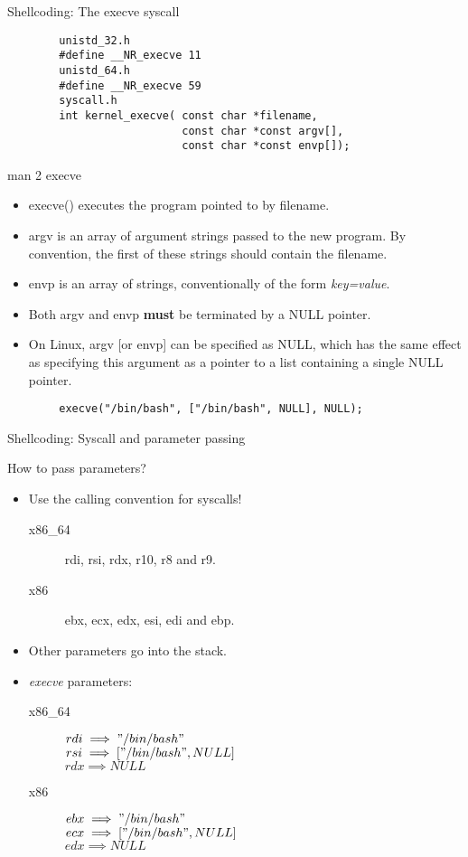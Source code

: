 \begin{frame}{Shellcoding: The execve syscall}
	\ccode
	\begin{lstlisting}
		unistd_32.h
		#define __NR_execve 11
		unistd_64.h
		#define __NR_execve 59
		syscall.h
		int kernel_execve( const char *filename,
		                   const char *const argv[],
		                   const char *const envp[]);
	\end{lstlisting}
	\begin{block}{man 2 execve}
		\begin{itemize}
			\item execve() executes  the  program  pointed to by filename.
			\item argv is an array of argument strings passed to the new program. By
				convention, the first of these  strings  should contain the filename.
			\item envp is an array of strings, conventionally of the form \emph{key=value}.
			\item Both argv and envp \textbf{must} be terminated by a NULL pointer.
			\item On Linux, argv [or envp] can be specified as NULL, which has the same effect as specifying  this  argument as a pointer to a list containing a single NULL pointer.
		\end{itemize}
	\end{block}
	\ccode
	\begin{lstlisting}
		execve("/bin/bash", ["/bin/bash", NULL], NULL);
	\end{lstlisting}
\end{frame}

\begin{frame}{Shellcoding: Syscall and parameter passing}
	\begin{block}{How to pass parameters?}
		\begin{itemize}
			\item Use the calling convention for syscalls!
				\begin{description}
					\item[x86\_64]rdi, rsi, rdx, r10, r8 and r9.
					\item[x86]ebx, ecx, edx, esi, edi and ebp.
				\end{description}
			\item Other parameters go into the stack.
			\item \emph{execve} parameters:
				\begin{description}
					\item[x86\_64] $rdi\implies "/bin/bash"$\\
						$rsi\implies ["/bin/bash", NULL]$\\
						$rdx\implies NULL$\\
					\item[x86]$ebx \implies "/bin/bash"$\\
						$ecx \implies ["/bin/bash", NULL]$\\
						$edx \implies NULL$
				\end{description}
		\end{itemize}
	\end{block}
\end{frame}

